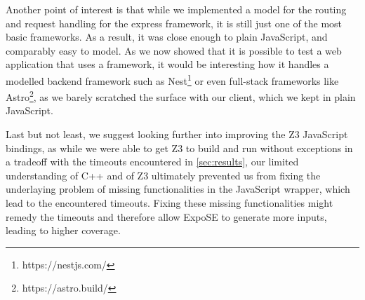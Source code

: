 Another point of interest is that while we implemented a model for the routing and request handling for the express framework, it is still just one of the most basic frameworks. As a result, it was close enough to plain JavaScript, and comparably easy to model. As we now showed that it is possible to test a web application that uses a framework, it would be interesting how it handles a modelled backend framework such as Nest\footnote{https://nestjs.com/} or even full-stack frameworks like Astro\footnote{https://astro.build/}, as we barely scratched the surface with our client, which we kept in plain JavaScript.



Last but not least, we suggest looking further into improving the Z3 JavaScript bindings, as while we were able to get Z3 to build and run without exceptions in a tradeoff with the timeouts encountered in \autoref{sec:results}, our limited understanding of C++  and of Z3 ultimately prevented us from fixing the underlaying problem of missing functionalities in the JavaScript wrapper, which lead to the encountered timeouts. Fixing these missing functionalities might remedy the timeouts and therefore allow ExpoSE to generate more inputs, leading to higher coverage.






